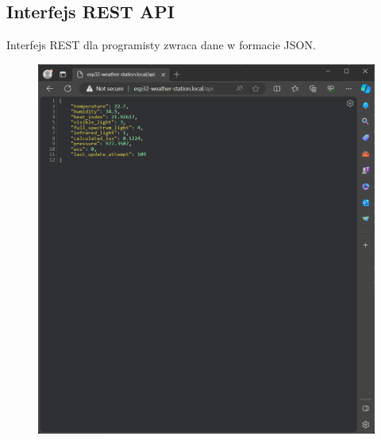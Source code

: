 \documentclass[12pt,a4paper]{article}
\begin{document}
\subsection{Interfejs REST API}
Interfejs REST dla programisty zwraca dane w formacie JSON.
\begin{figure}[H]
    \centering
    \includegraphics[width=\textwidth]{rest-api.png}
\end{figure}
\end{document}
